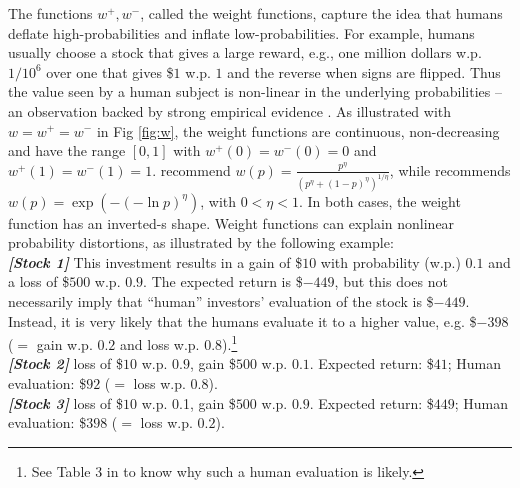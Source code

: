 The functions $w^+, w^-$, called the weight functions, capture the idea that humans deflate high-probabilities and inflate low-probabilities.
For example, humans usually choose a stock that gives a large reward, e.g., 
one million dollars w.p. $1/10^6$ over one that gives \$$1$ w.p. $1$ and the reverse when signs are flipped. 
Thus the value seen by a human subject is non-linear in the underlying probabilities -- an observation backed by strong empirical evidence \citep{tversky1992advances,Barberis:2012vs}.  
As illustrated with $w=w^+=w^-$ in Fig \ref{fig:w}, the weight functions are continuous, non-decreasing and  have the range $[0,1]$ with $w^+(0)=w^-(0)=0$ and $w^+(1)=w^-(1)=1$. 
\citet{tversky1992advances} recommend $w(p) = \frac{p^{\eta}}{{(p^{\eta}+ (1-p)^{\eta})}^{1/\eta}}$, while \citet{prelec1998probability} recommends $w(p) = \exp(-(-\ln p)^\eta)$, with $0 < \eta <1$. In both cases, the weight function has an inverted-s shape.
Weight functions can explain nonlinear probability distortions, as illustrated by the following example: \\
\textit{\textbf{[Stock 1]}} This investment results in a gain of \$$10$ with probability (w.p.) $0.1$ and a loss of \$$500$ w.p. $0.9$. The expected return is \$$-449$, but this does not necessarily imply that ``human'' investors' evaluation of the stock is \$$-449$. Instead, it is very likely that the humans evaluate it to a higher value, e.g. \$$-398$ ($=$ gain w.p. $0.2$ and loss w.p. $0.8$).\footnote{See Table 3 in \cite{tversky1992advances} to know why such a human evaluation is likely.}\\
\textit{\textbf{[Stock 2]}} loss of \$$10$ w.p. $0.9$, gain \$$500$ w.p. $0.1$. Expected return: \$$41$; Human evaluation: \$$92$ ($=$ loss w.p. $0.8$).\\
\textit{\textbf{[Stock 3]}} loss of \$$10$ w.p. 0.1, gain \$$500$ w.p. $0.9$. Expected return: \$$449$; Human evaluation: \$$398$ ($=$ loss w.p. $0.2$). 
\fi
